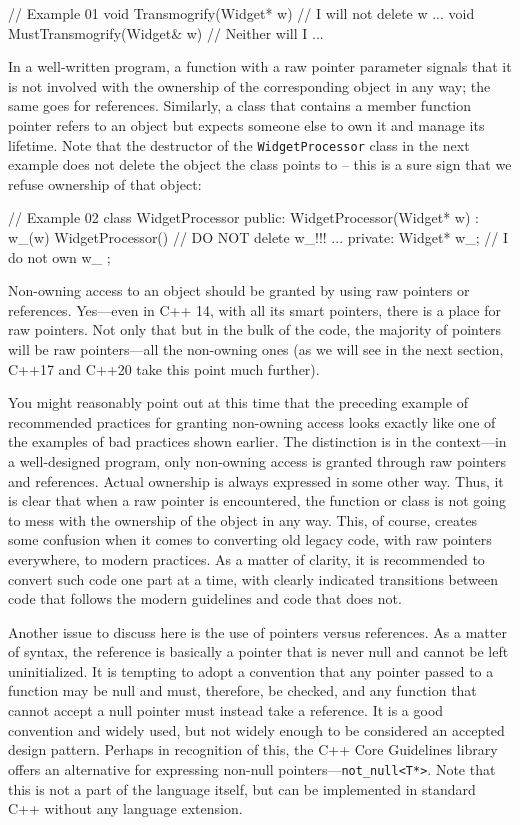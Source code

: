 \begin{code}
// Example 01
void Transmogrify(Widget* w) {        // I will not delete w
  ...
}
void MustTransmogrify(Widget& w) {   // Neither will I
  ...
}
\end{code}

In a well-written program, a function with a raw pointer parameter signals that it is not involved with the ownership of the corresponding object in any way; the same goes for references. Similarly, a class that contains a member function pointer refers to an object but expects someone else to own it and manage its lifetime. Note that the destructor of the \texttt{WidgetProcessor} class in the next example does not delete the object the class points to -- this is a sure sign that we refuse ownership of that object:

\begin{code}
// Example 02
class WidgetProcessor {
  public:
  WidgetProcessor(Widget* w) : w_(w) {}
  WidgetProcessor() {} // DO NOT delete w_!!!
    ...
  private:
  Widget* w_;    // I do not own w_
};
\end{code}

Non-owning access to an object should be granted by using raw pointers or references. Yes---even in C++ 14, with all its smart pointers, there is a place for raw pointers. Not only that but in the bulk of the code, the majority of pointers will be raw pointers---all the non-owning ones (as we will see in the next section, C++17 and C++20 take this point much further).

You might reasonably point out at this time that the preceding example of recommended practices for granting non-owning access looks exactly like one of the examples of bad practices shown earlier. The distinction is in the context---in a well-designed program, only non-owning access is granted through raw pointers and references. Actual ownership is always expressed in some other way. Thus, it is clear that when a raw pointer is encountered, the function or class is not going to mess with the ownership of the object in any way. This, of course, creates some confusion when it comes to converting old legacy code, with raw pointers everywhere, to modern practices. As a matter of clarity, it is recommended to convert such code one part at a time, with clearly indicated transitions between code that follows the modern guidelines and code that does not.

Another issue to discuss here is the use of pointers versus references. As a matter of syntax, the reference is basically a pointer that is never null and cannot be left uninitialized. It is tempting to adopt a convention that any pointer passed to a function may be null and must, therefore, be checked, and any function that cannot accept a null pointer must instead take a reference. It is a good convention and widely used, but not widely enough to be considered an accepted design pattern. Perhaps in recognition of this, the C++ Core Guidelines library offers an alternative for expressing non-null pointers---\texttt{not\_null\textless{}T*\textgreater{}}. Note that this is not a part of the language itself, but can be implemented in standard C++ without any language extension.

